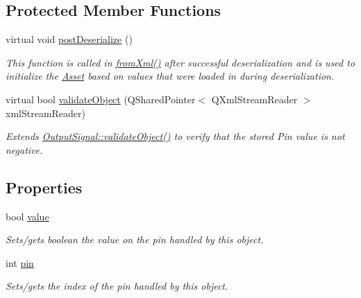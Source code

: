 \subsection*{Protected Member Functions}
\begin{DoxyCompactItemize}
\item 
virtual void \hyperlink{class_picto_1_1_digital_output_a44c3cb31438e4cecf53f63edbbd8866b}{post\-Deserialize} ()
\begin{DoxyCompactList}\small\item\em This function is called in \hyperlink{class_picto_1_1_asset_a8bed4da09ecb1c07ce0dab313a9aba67}{from\-Xml()} after successful deserialization and is used to initialize the \hyperlink{class_picto_1_1_asset}{Asset} based on values that were loaded in during deserialization. \end{DoxyCompactList}\item 
\hypertarget{class_picto_1_1_digital_output_a41b29997a13c465b0485923480c0255a}{virtual bool \hyperlink{class_picto_1_1_digital_output_a41b29997a13c465b0485923480c0255a}{validate\-Object} (Q\-Shared\-Pointer$<$ Q\-Xml\-Stream\-Reader $>$ xml\-Stream\-Reader)}\label{class_picto_1_1_digital_output_a41b29997a13c465b0485923480c0255a}

\begin{DoxyCompactList}\small\item\em Extends \hyperlink{struct_picto_1_1_output_signal_a5401d53b65a3664df866aef4455d42fe}{Output\-Signal\-::validate\-Object()} to verify that the stored Pin value is not negative. \end{DoxyCompactList}\end{DoxyCompactItemize}
\subsection*{Properties}
\begin{DoxyCompactItemize}
\item 
\hypertarget{class_picto_1_1_digital_output_a26bc10df93b98a92243f23bc8515ecb2}{bool \hyperlink{class_picto_1_1_digital_output_a26bc10df93b98a92243f23bc8515ecb2}{value}}\label{class_picto_1_1_digital_output_a26bc10df93b98a92243f23bc8515ecb2}

\begin{DoxyCompactList}\small\item\em Sets/gets boolean the value on the pin handled by this object. \end{DoxyCompactList}\item 
\hypertarget{class_picto_1_1_digital_output_aeedde6eb50dc034c32c0803cd623e78f}{int \hyperlink{class_picto_1_1_digital_output_aeedde6eb50dc034c32c0803cd623e78f}{pin}}\label{class_picto_1_1_digital_output_aeedde6eb50dc034c32c0803cd623e78f}

\begin{DoxyCompactList}\small\item\em Sets/gets the index of the pin handled by this object. \end{DoxyCompactList}\end{DoxyCompactItemize}
